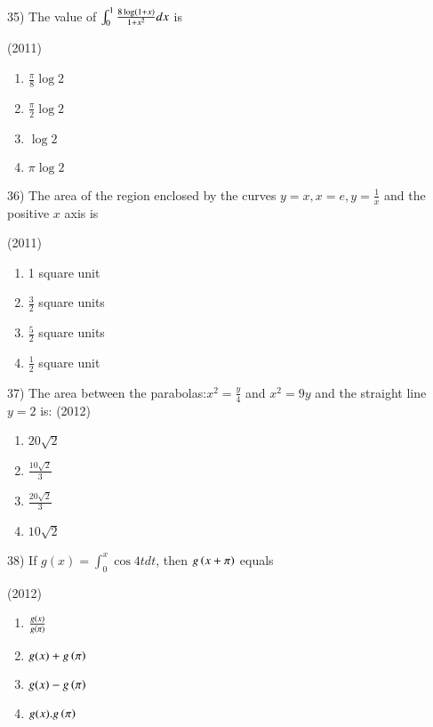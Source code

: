 \documentclass[journal,12pt,twocolumn]{IEEEtran}
\theoremstyle{remark}
\begin{document}
35)
	 The value of $\int_0^1\frac{8\log\left(1+x\right)}{1+x^2}dx$ is

		\hfill{(2011)}

		\begin{multicols}{2}
			\begin{enumerate}
				\item $\frac{\pi}{8}\log2$
				\item $\frac{\pi}{2}\log2$
				\item $\log 2$
				\item $\pi \log2$
			\end{enumerate}
		\end{multicols}

36)
	 The area of the region enclosed by the curves $y=x, x=e, y=\frac{1}{x}$ and the positive $x$ axis is

		\hfill{(2011)}

		\begin{multicols}{2}
			\begin{enumerate}
				\item 1 square unit
				\item $\frac{3}{2}$ square units
				\item $\frac{5}{2}$ square units
				\item $\frac{1}{2}$ square unit
			\end{enumerate}
		\end{multicols}

37)
	 The area between the parabolas:$x^2=\frac{y}{4}$ and $x^2=9y$ and the straight line $y=2$ is:
		\hfill{(2012)}

		\begin{multicols}{4}
			\begin{enumerate}
				\item $20\sqrt{2}$
				\item $\frac{10\sqrt{2}}{3}$
				\item $\frac{20\sqrt{2}}{3}$
				\item $10\sqrt{2}$
			\end{enumerate}
		\end{multicols}

38)
	 If $g(x)=\int_0^x\cos 4t dt$, then $g\left(x+\pi\right)$ equals

		\hfill{(2012)}

		\begin{multicols}{2}
			\begin{enumerate}[label=(\alph*)]
				\item $\frac{g(x)}{g\left(\pi\right)}$
				\item $g(x)+g\left(\pi\right)$
				\item $g(x)-g\left(\pi\right)$
				\item $g(x).g\left(\pi\right)$
			\end{enumerate}
		\end{multicols}
\end{document}
